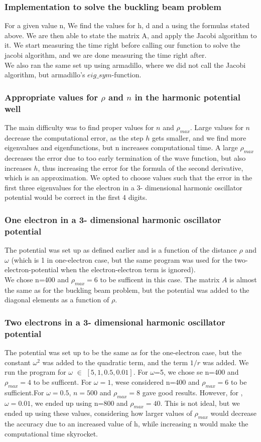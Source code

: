 \documentclass[10pt,a4paper]{article}
\begin{document}
\subsubsection{Implementation to solve the buckling beam problem}
For a given value n, We find the values for h, d and a using the formulas stated above. We are then able to state the matrix A, and apply the Jacobi algorithm to it. We start measuring the time right before calling our function to solve the jacobi algorithm, and we are done measuring the time right after. \\
We also ran the same set up using armadillo, where we did not call the Jacobi algorithm, but armadillo's $eig\_sym$-function.
\subsubsection{Appropriate values for $\rho$ and $n$ in the harmonic potential well}
The main difficulty was to find proper values for $n$ and $\rho_{max}$. Large values for $n$ decrease the computational error, as the step $h$ gets smaller, and we find more eigenvalues and eigenfunctions, but n increases computational time. A large $\rho_{max}$ decreases the error due to too early termination of the wave function, but also increases $h$, thus increasing the error for the formula of the second derivative, which is an approximation. We opted to choose values such that the error in the first  three eigenvalues for the electron in a 3- dimensional harmonic oscillator potential would be correct in the first 4 digits.
\subsubsection{One electron in a 3- dimensional harmonic oscillator potential}
The potential was set up as defined earlier and is a function of the distance $\rho$ and $\omega$ (which is 1 in one-electron case, but the same program was used for the two-electron-potential when the electron-electron term is ignored). \\
We chose n=400 and  $\rho_{max}=6$ to be sufficent in this case. The matrix $A$ is almost the same as for the buckling beam problem, but the potential was added to the diagonal elements as a function of $\rho$.
\subsubsection{Two electrons in a 3- dimensional harmonic oscillator potential}
The potential was set up to be the same as for the one-electron case, but the constant  $\omega^2$ was added to the quadratic term, and the term $1/r$ was added. We run the program for  $\omega$ $\in$ $[5,1,0.5,0.01]$. 
For $\omega$=5, we chose se n=400 and  $\rho_{max}=4$ to be sufficent. For $\omega=1$, wese considered n=400 and  $\rho_{max}=6$ to be sufficient.For $\omega=0.5$, $n=500$ and  $\rho_{max}=8$ gave good results. However, for ,$\omega=0.01$, we ended up using n=800 and   $\rho_{max}=40$. This is not ideal, but we ended up using these values, considering how larger values of  $\rho_{max}$ would decrease the accuracy due to an increased value of h, while increasing n would make the computational time skyrocket. 
\end{document}

